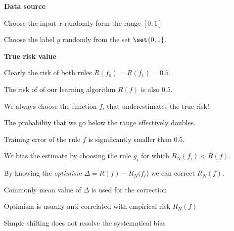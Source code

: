 \documentclass[landscape,footrule]{foils}
\begin{document}
\textbf{Data source}
\begin{triangles}
\item Choose the input $x$ randomly form the range $[0,1]$
\item Choose the label $y$ randomly from the set $\set{0,1}$.
\end{triangles}

\vspace*{1cm}
\textbf{True risk value}
\begin{triangles}
\item Clearly the risk of both rules $R(f_0)=R(f_1)=0.5$.
\item The risk of of our learning algorithm $R(f)$ is also $0.5$. 
\end{triangles}



\begin{triangles}
\item We always choose the function $f_i$ that underestimates the true risk!
\item The probability that we go below the range effectively doubles. 
\end{triangles}



\vspace*{-0.5cm}

Training error of the rule $f$ is significantly smaller than $0.5$.
\begin{triangles}
\item We bias the estimate by choosing the rule $g_i$ for which $R_N(f_i) < R(f)$.
\end{triangles}


\vspace*{-0.5cm}
By knowing the \emph{optimism} $\Delta=R(f)-R_N(f_i$) we can correct $R_N(f)$.   
\begin{triangles}
\item Commonly mean value of $\Delta$ is used for the correction 
\end{triangles}



\vspace*{-0.5cm}
Optimism is usually anti-correlated with empirical risk $R_N(f)$   
\begin{triangles}
\item Simple shifting does not resolve the systematical bias  
\end{triangles}
\end{document}
